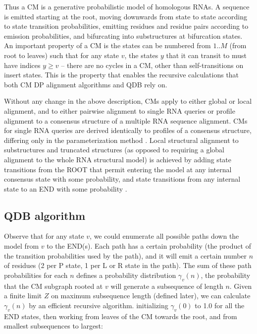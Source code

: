 \documentclass[11pt]{article}
\begin{document}
Thus a CM is a generative probabilistic model of homologous RNAs.  A
sequence is emitted starting at the root, moving downwards from state
to state according to state transition probabilities, emitting
residues and residue pairs according to emission probabilities, and
bifurcating into substructures at bifurcation states. An important
property of a CM is the states can be numbered from $1..M$ (from root
to leaves) such that for any state $v$, the states $y$ that it can
transit to must have indices $y \geq v$ -- there are no cycles in a
CM, other than self-transitions on insert states.  This is the
property that enables the recursive calculations that both CM DP
alignment algorithms and QDB rely on.

Without any change in the above description, CMs apply to either
global or local alignment, and to either pairwise alignment to single
RNA queries or profile alignment to a consensus structure of a
multiple RNA sequence alignment. CMs for single RNA queries are
derived identically to profiles of a consensus structure, differing
only in the parameterization method \cite{KleinEddy03}. Local
structural alignment to substructures and truncated structures (as
opposed to requiring a global alignment to the whole RNA structural
model) is achieved by adding state transitions from the ROOT that
permit entering the model at any internal consensus state with some
probability, and state transitions from any internal state to an END
with some probability \cite{KleinEddy03}.

\subsection{QDB algorithm}

Observe that for any state $v$, we could enumerate all possible paths
down the model from $v$ to the END(s). Each path has a certain
probability (the product of the transition probabilities used by the
path), and it will emit a certain number $n$ of residues (2 per P
state, 1 per L or R state in the path). The sum of these path
probabilities for each $n$ defines a probability distribution
$\gamma_v(n)$, the probability that the CM subgraph rooted at $v$ will
generate a subsequence of length $n$. Given a finite limit $Z$ on
maximum subsequence length (defined later), we can calculate
$\gamma_v(n)$ by an efficient recursive algorithm. initializing
$\gamma_{v}(0)$ to 1.0 for all the END states, then working from
leaves of the CM towards the root, and from smallest subsequences to
largest:
\end{document}

